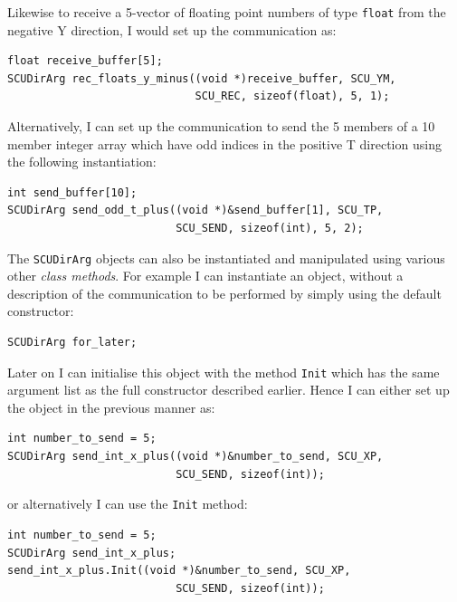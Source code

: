 Likewise to receive a 5-vector of floating point numbers of type {\tt float}
from the negative Y direction, I would set up the communication as:
\begin{verbatim}
float receive_buffer[5];
SCUDirArg rec_floats_y_minus((void *)receive_buffer, SCU_YM, 
                             SCU_REC, sizeof(float), 5, 1);
\end{verbatim}

Alternatively, I can set up the communication to send the 5 members of a 10 member integer array which have odd indices in the positive T direction using the
following instantiation:
\begin{verbatim}
int send_buffer[10];
SCUDirArg send_odd_t_plus((void *)&send_buffer[1], SCU_TP, 
                          SCU_SEND, sizeof(int), 5, 2);
\end{verbatim}

The {\tt SCUDirArg} objects can also be instantiated and manipulated using
various other {\em class methods}. For example I can instantiate an
object, without a description of the communication to be performed 
by simply using the default constructor:
\begin{verbatim}
SCUDirArg for_later;
\end{verbatim}
Later on I can initialise this object with the method {\tt Init}
which has the same argument list as the full constructor described earlier.
Hence I can either set up the object in the previous manner as:
\begin{verbatim}
int number_to_send = 5;
SCUDirArg send_int_x_plus((void *)&number_to_send, SCU_XP, 
                          SCU_SEND, sizeof(int));
\end{verbatim}
or alternatively I can use the {\tt Init} method:
\begin{verbatim}
int number_to_send = 5;
SCUDirArg send_int_x_plus;
send_int_x_plus.Init((void *)&number_to_send, SCU_XP, 
                          SCU_SEND, sizeof(int));
\end{verbatim}

